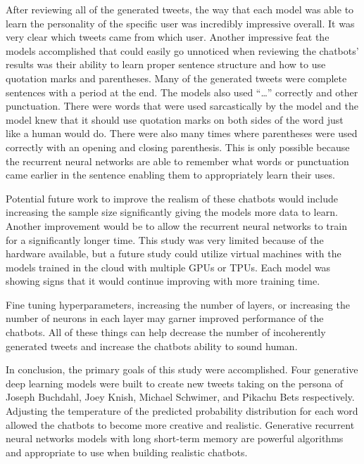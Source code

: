 \documentclass[5p,authoryear]{elsarticle}
\begin{document}
After reviewing all of the generated tweets, the way that each model was able to learn the personality of the specific user was incredibly impressive overall. It was very clear which tweets came from which user. Another impressive feat the models accomplished that could easily go unnoticed when reviewing the chatbots’ results was their ability to learn proper sentence structure and how to use quotation marks and parentheses. Many of the generated tweets were complete sentences with a period at the end. The models also used “…” correctly and other punctuation. There were words that were used sarcastically by the model and the model knew that it should use quotation marks on both sides of the word just like a human would do. There were also many times where parentheses were used correctly with an opening and closing parenthesis. This is only possible because the recurrent neural networks are able to remember what words or punctuation came earlier in the sentence enabling them to appropriately learn their uses.

Potential future work to improve the realism of these chatbots would include increasing the sample size significantly giving the models more data to learn. Another improvement would be to allow the recurrent neural networks to train for a significantly longer time. This study was very limited because of the hardware available, but a future study could utilize virtual machines with the models trained in the cloud with multiple GPUs or TPUs. Each model was showing signs that it would continue improving with more training time.

Fine tuning hyperparameters, increasing the number of layers, or increasing the number of neurons in each layer may garner improved performance of the chatbots. All of these things can help decrease the number of incoherently generated tweets and increase the chatbots ability to sound human.

In conclusion, the primary goals of this study were accomplished. Four generative deep learning models were built to create new tweets taking on the persona of Joseph Buchdahl, Joey Knish, Michael Schwimer, and Pikachu Bets respectively. Adjusting the temperature of the predicted probability distribution for each word allowed the chatbots to become more creative and realistic. Generative recurrent neural networks models with long short-term memory are powerful algorithms and appropriate to use when building realistic chatbots.


\clearpage

\label{Appendix}
\end{document}
